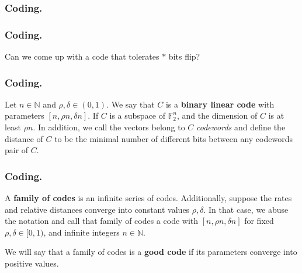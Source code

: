 \documentclass[usenames, aspectratio=169]{beamer}
\begin{document}
\begin{frame}
  \frametitle{ Coding. }
  \begin{center}
\end{center}
\end{frame}

\begin{frame}
  \frametitle{ Coding. }
  Can we come up with a code that tolerates $*$ bits flip? 
\end{frame} 

\begin{frame}
  \frametitle{ Coding. }
\begin{definition} 
  Let $n \in \mathbb{N}$ and $\rho, \delta\in \left( 0,1 \right)$. We say that $C$ is a \textbf{binary linear code} with parameters $[n, \rho n, \delta n]$. If $C$ is a subspace of $\mathbb{F}_{2}^{n}$, and the dimension of $C$ is at least $\rho n$. In addition, we call the vectors belong to $C$ \textit{codewords} and define the distance of $C$ to be the minimal number of different bits between any codewords pair of $C$.   
  \end{definition}
\end{frame} 

\begin{frame}
  \frametitle{ Coding. }
\begin{definition} 
  A \textbf{family of codes} is an infinite series of codes. Additionally, suppose the rates and relative distances converge into constant values $\rho,\delta$. In that case, we abuse the notation and call that family of codes a code with $[n, \rho n, \delta n]$ for fixed $\rho, \delta\in [ 0,1 )$, and infinite integers $n \in \mathbb{N}$.     
  \end{definition}
\begin{definition} 
  We will say that a family of codes is a \textbf{good code} if its parameters converge into positive values. 
  \end{definition}
\end{frame} 
\end{document}
